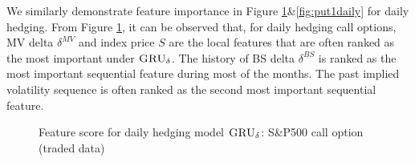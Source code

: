 \documentclass[letterpaper,12pt,titlepage,oneside,final]{book}
\numberwithin{equation}{section}
\theoremstyle{definition}
\newcommand{\model}{\textsc{GRU}_\delta}
\begin{document}
We similarly demonstrate feature importance in Figure \ref{fig:call1daily}\&\ref{fig:put1daily} for daily hedging.  From Figure \ref{fig:call1daily}, it can be observed that, for daily hedging call options, MV delta $\delta^{MV}$ and index price $S$ are the local features that are often ranked as the most important under $\model$. The history of BS delta $\delta^{BS}$ is ranked as the most important sequential feature during most of the months. The past implied volatility sequence is often ranked as the second most important sequential feature.
\begin{figure}[htp]
\centering
{}
\caption{Feature score for daily hedging model $\model$: S\&P500 call option (traded data)} \label{fig:call1daily}
\end{figure}
\end{document}
